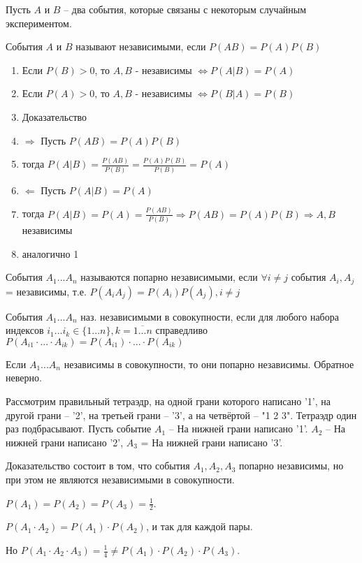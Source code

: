 
Пусть $A$ и $B$ -- два события, которые связаны с некоторым случайным экспериментом. 

\OPR События $A$ и $B$ называют независимыми, если $P(AB)=P(A)P(B)$

\THRM 
\begin{enumerate}[topsep=0pt, leftmargin=20pt, noitemsep]
	\item Если $P(B) > 0$, то $A,B$ - независимы $\Leftrightarrow P(A|B) = P(A)$
	
	\item Если $P(A) > 0$, то $A,B$ - независимы $\Leftrightarrow P(B|A) = P(B)$
	
	\item [] Доказательство

	\setcounter{enumi}{0}
	
	\item $\Rightarrow$ Пусть $P(AB)=P(A)P(B)$
	\item [] тогда $P(A|B)=\tfrac{P(AB)}{P(B)}=\tfrac{P(A)P(B)}{P(B)} = P(A)$
	\item [] $\Leftarrow$ Пусть $P(A|B) = P(A)$
	\item [] тогда $P(A|B)=P(A)=\tfrac{P(AB)}{P(B)}\Rightarrow P(AB)= P(A)P(B)\Rightarrow A,B $ независимы
	
	\item аналогично 1
\end{enumerate}

\OPR События $A_1...A_n$ называются попарно независимыми, если $\forall i\neq j$ события $A_i, A_j$ = независимы, т.е. $P(A_iA_j)=P(A_i)P(A_j), i\neq j$

\OPR События $A_1...A_n$ наз. независимыми в совокупности, если для любого набора индексов $i_1...i_k\in \{1...n\}, k=\overline{1...n}$ справедливо $P(A_{i1}\cdot...\cdot A_{ik}) = P(A_{i1})\cdot...\cdot P(A_{ik})$

\ZAM Если $A_1...A_n$ независимы в совокупности, то они попарно независимы. Обратное неверно.

\PRIM Рассмотрим правильный тетраэдр, на одной грани которого написано '1', на другой грани -- '2', на третьей грани -- '3', а на четвёртой -- "1 2 3". Тетраэдр один раз подбрасывают. Пусть событие $A_1$ -- {На нижней грани написано '1'}. $A_2$ -- {На нижней грани написано '2'}, $A_3$ = {На нижней грани написано '3'}. 

Доказательство состоит в том, что события $A_1, A_2, A_3$ попарно независимы, но при этом не являются независимыми в совокупности.

$P(A_1) = P(A_2) = P(A_3) = \frac{1}{2}$.

$P(A_1 \cdot A_2) = P(A_1) \cdot P(A_2)$, и так для каждой пары.

Но $P(A_1 \cdot A_2 \cdot A_3) = \frac{1}{4} \neq P(A_1) \cdot P(A_2) \cdot P(A_3)$.

\clearpage
